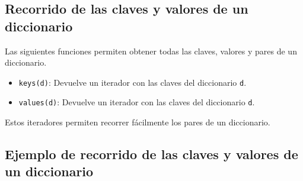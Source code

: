 \documentclass[
  letterpaper,
  DIV=11,
  numbers=noendperiod]{scrreprt}
\providecommand{\tightlist}{%
  \setlength{\itemsep}{0pt}\setlength{\parskip}{0pt}}\usepackage{longtable,booktabs,array}
\begin{document}
\hypertarget{recorrido-de-las-claves-y-valores-de-un-diccionario}{%
\subsection{Recorrido de las claves y valores de un
diccionario}\label{recorrido-de-las-claves-y-valores-de-un-diccionario}}

Las siguientes funciones permiten obtener todas las claves, valores y
pares de un diccionario.

\begin{itemize}
\tightlist
\item
  \texttt{keys(d)}: Devuelve un iterador con las claves del diccionario
  \texttt{d}.
\item
  \texttt{values(d)}: Devuelve un iterador con las claves del
  diccionario \texttt{d}.
\end{itemize}

Estos iteradores permiten recorrer fácilmente los pares de un
diccionario.

\hypertarget{ejemplo-de-recorrido-de-las-claves-y-valores-de-un-diccionario}{%
\subsection{Ejemplo de recorrido de las claves y valores de un
diccionario}\label{ejemplo-de-recorrido-de-las-claves-y-valores-de-un-diccionario}}
\end{document}
